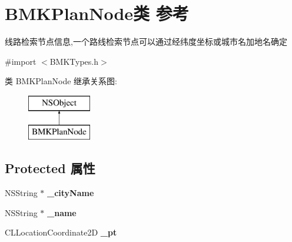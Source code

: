 \hypertarget{interface_b_m_k_plan_node}{}\section{B\+M\+K\+Plan\+Node类 参考}
\label{interface_b_m_k_plan_node}


线路检索节点信息,一个路线检索节点可以通过经纬度坐标或城市名加地名确定  




{\ttfamily \#import $<$B\+M\+K\+Types.\+h$>$}

类 B\+M\+K\+Plan\+Node 继承关系图\+:\begin{figure}[H]
\begin{center}
\leavevmode
\includegraphics[height=2.000000cm]{interface_b_m_k_plan_node}
\end{center}
\end{figure}
\subsection*{Protected 属性}
\begin{DoxyCompactItemize}
\item 
\hypertarget{interface_b_m_k_plan_node_a1536db105328adee8a9e0c44804d8755}{}N\+S\+String $\ast$ {\bfseries \+\_\+city\+Name}\label{interface_b_m_k_plan_node_a1536db105328adee8a9e0c44804d8755}

\item 
\hypertarget{interface_b_m_k_plan_node_a6eeeeb61aa4389cea7e8ebb1d03a4d61}{}N\+S\+String $\ast$ {\bfseries \+\_\+name}\label{interface_b_m_k_plan_node_a6eeeeb61aa4389cea7e8ebb1d03a4d61}

\item 
\hypertarget{interface_b_m_k_plan_node_a503dbc9a4e2e07e81c3a701b64fcd3c3}{}C\+L\+Location\+Coordinate2\+D {\bfseries \+\_\+pt}\label{interface_b_m_k_plan_node_a503dbc9a4e2e07e81c3a701b64fcd3c3}

\end{DoxyCompactItemize}
